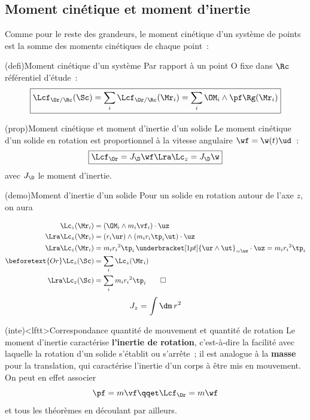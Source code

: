 \documentclass[../../main/main.tex]{subfiles}
\begin{document}
\subsection{Moment cinétique et moment d'inertie}
Comme pour le reste des grandeurs, le moment cinétique d'un système de points
est la somme des moments cinétiques de chaque point~:
\begin{tcb*}(defi){Moment cinétique d'un système}
	Par rapport à un point O fixe dans $\Rc$ référentiel d'étude~:
	\[
		\boxed{\Lcf_{\Or/\Rc}(\Sc) = \sum_i\Lcf_{\Or/\Rc}(\Mr_i)
			= \sum_i \OM_i\wedge\pf\Rg(\Mr_i)}
	\]
\end{tcb*}
\begin{tcb*}(prop){Moment cinétique et moment d'inertie d'un solide}
	Le moment cinétique d'un solide en rotation est proportionnel à la vitesse
	angulaire $\wf = \w(t)\ud$~:
	\[
		\boxed{
			\Lcf_{\Or} = J_{\D}\wf
			\Lra
			\Lc_z = J_{\D}\w
		}
	\]
	avec $J_{\D}$ le moment d'inertie.
\end{tcb*}
\begin{tcb*}(demo){Moment d'inertie d'un solide}
	Pour un solide en rotation autour de l'axe $z$, on aura
	\smallbreak
	\begin{isd}[sidebyside align=top]
		\begin{align*}
			\Lc_z(\Mr_i) & = (\OM_i\wedge m_i\vf_i)\cdot\uz
			\\\Lra
			\Lc_z(\Mr_i) & = (r_i\ur)\wedge(m_ir_i\tp_i\ut)\cdot\uz
			\\\Lra
			\Lc_z(\Mr_i) & = m_ir_i{}^2\tp_i\,
			\underbracket[1pt]{\ur\wedge\ut}_{=\uz}\cdot\uz = m_ir_i{}^2\tp_i
			\\
			\beforetext{Or}
			\Lc_z(\Sc)   & = \sum_i \Lc_z(\Mr_i)
			\\\Lra
			\Lc_z(\Sc)   & = \sum_i m_ir_i{}^2\tp_i
			\qed
		\end{align*}
		\tcblower
		\begin{gather*}
			J_z = \int \dm\,r^2
		\end{gather*}
	\end{isd}
\end{tcb*}

\begin{tcb*}(inte)<lftt>{Correspondance quantité de mouvement et quantité de rotation}
	Le moment d'inertie caractérise \textbf{l'inertie de rotation}, c'est-à-dire
	la facilité avec laquelle la rotation d'un solide s'établit ou s'arrête~; il
	est analogue à la \textbf{masse} pour la translation, qui caractérise
	l'inertie d'un corps à être mis en mouvement. On peut en effet associer
	\[
		\pf = m\vf
		\qqet
		\Lcf_{\Or} = m\wf
	\]
	et tous les théorèmes en découlant par ailleurs.
\end{tcb*}
\end{document}
